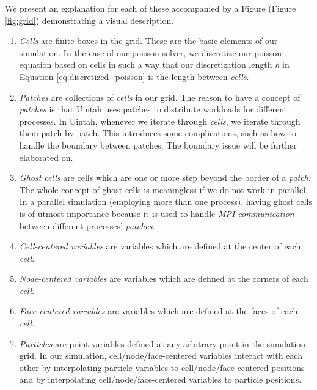 \documentclass[notitlepage, 12pt]{article}
\begin{document}
We present an explanation for each of these accompanied by a Figure (Figure \ref{fig:grid}) demonstrating a visual description.

\begin{enumerate}
\item \emph{Cells} are finite boxes in the grid. These are the basic elements of our simulation. In the case of our poisson solver, we discretize our poisson equation 
based on cells in such a way that our discretization length \emph{h} in Equation \ref{eq:discretized_poisson} is the length between \emph{cells}.
\item \emph{Patches} are collections of \emph{cells} in our grid. The reason to have a concept of \emph{patches} is that Uintah uses patches to distribute 
workloads for different processes. In Uintah, whenever we iterate through \emph{cells}, we iterate through them patch-by-patch. This introduces some complications, 
such as how to handle the boundary between patches. The boundary issue will be further elaborated on.
\item \emph{Ghost cells} are cells which are one or more step beyond the border of a \emph{patch}. The whole concept of ghost cells is meaningless if we 
do not work in parallel. In a parallel simulation (employing more than one process), having ghost cells is of utmost importance because it is used to handle 
\emph{MPI communication} between different processes' \emph{patches}.
\item \emph{Cell-centered variables} are variables which are defined at the center of each \emph{cell}.
\item \emph{Node-centered variables} are variables which are defined at the corners of each \emph{cell}.
\item \emph{Face-centered variables} are variables which are defined at the faces of each \emph{cell}.
\item \emph{Particles} are point variables defined at any arbitrary point in the simulation grid. In our simulation, cell/node/face-centered variables 
interact with each other by interpolating particle variables to cell/node/face-centered positions and by interpolating cell/node/face-centered variables to 
particle positions.
\end{enumerate}
\end{document}
